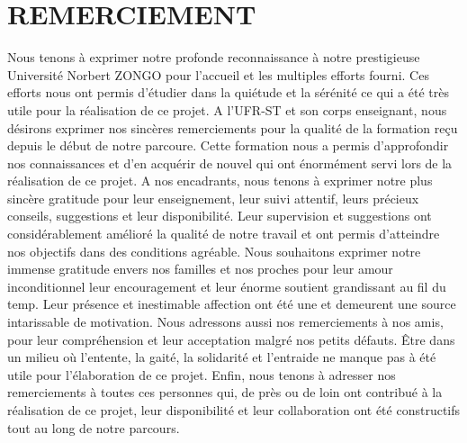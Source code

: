 \chapter*{REMERCIEMENT}
\thispagestyle{MyStyle}

Nous tenons à exprimer notre profonde reconnaissance à notre prestigieuse Université Norbert ZONGO pour l’accueil et les multiples efforts fourni. Ces efforts nous ont permis d’étudier dans la quiétude et la sérénité ce qui a été très utile pour la réalisation de ce projet. 
A l’UFR-ST et son corps enseignant, nous désirons exprimer nos sincères remerciements pour la qualité de la formation reçu depuis le début de notre parcoure. Cette formation nous a permis d’approfondir nos connaissances et d’en acquérir de nouvel qui ont énormément servi lors de la réalisation de ce projet.
    A nos encadrants, nous tenons à exprimer notre plus sincère gratitude pour leur enseignement, leur suivi attentif, leurs précieux conseils, suggestions et leur disponibilité. Leur supervision et suggestions ont considérablement amélioré la qualité de notre travail et ont permis d’atteindre nos objectifs dans des conditions agréable.
Nous souhaitons exprimer notre immense gratitude envers nos familles et nos proches pour leur amour inconditionnel leur encouragement et leur énorme soutient grandissant au fil du temp. Leur présence et inestimable affection ont été une et demeurent une source intarissable de motivation.
Nous adressons aussi nos remerciements à nos amis, pour leur compréhension et leur acceptation malgré nos petits défauts. Être dans un milieu où l’entente, la gaité, la solidarité et l’entraide ne manque pas à été utile pour l’élaboration de ce projet.
Enfin, nous tenons à adresser nos remerciements à toutes ces personnes qui, de près ou de loin ont contribué à la réalisation de ce projet, leur disponibilité et leur collaboration ont été constructifs tout au long de notre parcours.
\par